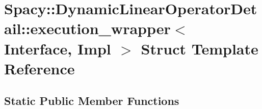 \hypertarget{structSpacy_1_1DynamicLinearOperatorDetail_1_1execution__wrapper}{\section{\-Spacy\-:\-:\-Dynamic\-Linear\-Operator\-Detail\-:\-:execution\-\_\-wrapper$<$ \-Interface, \-Impl $>$ \-Struct \-Template \-Reference}
\label{structSpacy_1_1DynamicLinearOperatorDetail_1_1execution__wrapper}
}
\subsection*{\-Static \-Public \-Member \-Functions}
